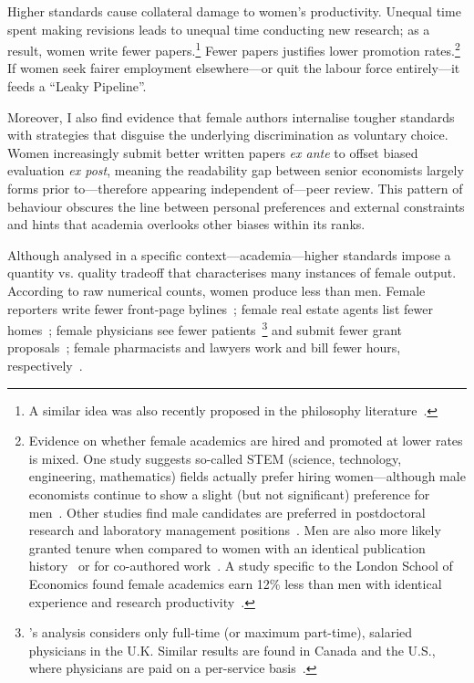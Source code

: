 Higher standards cause collateral damage to women's productivity. Unequal time spent making revisions leads to unequal time conducting new research; as a result, women write fewer papers.\footnote{A similar idea was also recently proposed in the philosophy literature~\citep[see][]{Bright2017,Lee2016}.} Fewer papers justifies lower promotion rates.\footnote{Evidence on whether female academics are hired and promoted at lower rates is mixed. One study suggests so-called STEM (science, technology, engineering, mathematics) fields actually prefer hiring women---although male economists continue to show a slight (but not significant) preference for men~\citep{Williams2015}. Other studies find male candidates are preferred in postdoctoral research and laboratory management positions~\citep{Moss-Racusin2012,Sheltzer2014}. Men are also more likely granted tenure when compared to women with an identical publication history~\citep{Weisshaar2017} or for co-authored work~\citep{Sarsons2017}. A study specific to the London School of Economics found female academics earn 12\% less than men with identical experience and research productivity~\citep{Bandiera2016}.} If women seek fairer employment elsewhere---or quit the labour force entirely---it feeds a ``Leaky Pipeline''.

Moreover, I also find evidence that female authors internalise tougher standards with strategies that disguise the underlying discrimination as voluntary choice. Women increasingly submit better written papers \emph{ex ante} to offset biased evaluation \emph{ex post}, meaning the readability gap between senior economists largely forms prior to---therefore appearing independent of---peer review. This pattern of behaviour obscures the line between personal preferences and external constraints and hints that academia overlooks other biases within its ranks.

Although analysed in a specific context---academia---higher standards impose a quantity vs. quality tradeoff that characterises many instances of female output. According to raw numerical counts, women produce less than men. Female reporters write fewer front-page bylines~\citep{Klos2014}; female real estate agents list fewer homes~\citep{Seagraves2013}; female physicians see fewer patients~\citep{Bloor2008}\footnote{\citet{Bloor2008}'s analysis considers only full-time (or maximum part-time), salaried physicians in the U.K. Similar results are found in Canada and the U.S., where physicians are paid on a per-service basis~\citep{CICH2005,Benedetti2004}.} and submit fewer grant proposals~\citep{Gordon2009}; female pharmacists and lawyers work and bill fewer hours, respectively~\citep{Azmat2017,Goldin2016}.


